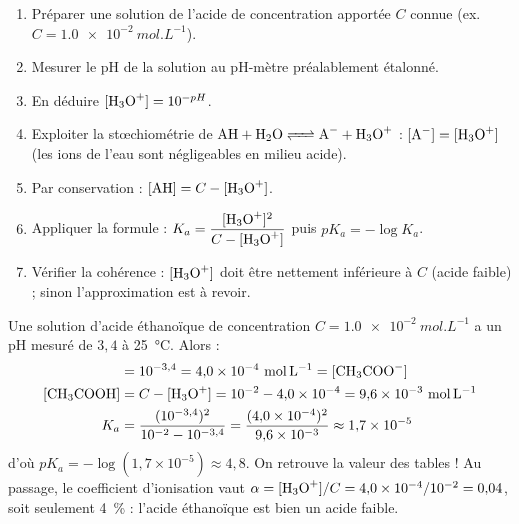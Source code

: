 \documentclass[11pt]{article}
\begin{document}
\begin{methode}
\begin{enumerate}
\item Préparer une solution de l'acide  de concentration apportée $C$ connue (ex. $C = \SI{1,0e-2}{mol.L^{-1}}$).
\item Mesurer le pH de la solution au pH-mètre préalablement étalonné.
\item En déduire $[\ce{H3O+}] = 10^{-pH}$.
\item Exploiter la stœchiométrie de $\ce{AH + H2O <=> A- + H3O+}$ : $[\ce{A-}] = [\ce{H3O+}]$ (les ions  de l'eau sont négligeables en milieu acide).
\item Par conservation : $[\ce{AH}] = C - [\ce{H3O+}]$.
\item Appliquer la formule : $K_a = \dfrac{[\ce{H3O+}]^2}{C - [\ce{H3O+}]}$ puis $pK_a = -\log K_a$.
\item Vérifier la cohérence : $[\ce{H3O+}]$ doit être nettement inférieure à $C$ (acide faible) ; sinon l'approximation est à revoir.
\end{enumerate}
\end{methode}

\begin{exemplebox}
Une solution d'acide éthanoïque de concentration $C = \SI{1,0e-2}{mol.L^{-1}}$ a un pH mesuré de $3{,}4$ à \SI{25}{\celsius}. Alors :
\begin{align*}
[\ce{H3O+}] &= 10^{-3{,}4} = 4{,}0\times 10^{-4}\ \si{mol.L^{-1}} = [\ce{CH3COO-}] \\
[\ce{CH3COOH}] &= C - [\ce{H3O+}] = 10^{-2} - 4{,}0\times 10^{-4} = 9{,}6\times 10^{-3}\ \si{mol.L^{-1}} \\
K_a &= \frac{(10^{-3{,}4})^2}{10^{-2} - 10^{-3{,}4}} = \frac{(4{,}0\times 10^{-4})^2}{9{,}6\times 10^{-3}} \approx 1{,}7\times 10^{-5}
\end{align*}
d'où $pK_a = -\log(1{,}7\times 10^{-5}) \approx 4{,}8$. On retrouve la valeur des tables ! Au passage, le coefficient d'ionisation vaut $\alpha = [\ce{H3O+}]/C = 4{,}0\times 10^{-4}/10^{-2} = 0{,}04$, soit seulement \SI{4}{\percent} : l'acide éthanoïque est bien un acide faible.
\end{exemplebox}
\end{document}
